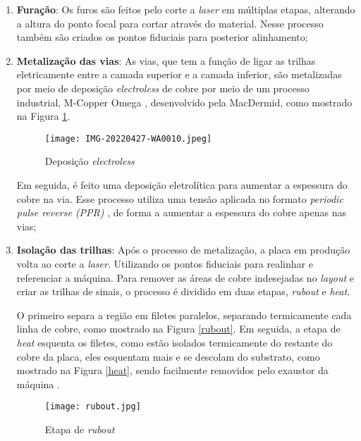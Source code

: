 \begin{enumerate}
    \item \textbf{Furação}: Os furos são feitos pelo corte a \textit{laser} em múltiplas etapas, alterando a altura do ponto focal para cortar através do material. Nesse processo também são criados os pontos fiduciais para posterior alinhamento;
    
    \item \textbf{Metalização das vias}: As vias, que tem a função de ligar as trilhas eletricamente entre a camada superior e a camada inferior, são metalizadas por meio de deposição \textit{electroless} de cobre por meio de um processo industrial, M-Copper Omega \cite{macdermid}, desenvolvido pela MacDermid, como mostrado na Figura \ref{electroless}.
    
        \begin{figure}[htbp]
            \centering
            \caption{Deposição \textit{electroless}}
            \texttt{[image: IMG-20220427-WA0010.jpeg]}
            
            \centering
            \label{electroless}
        \end{figure}
    Em seguida, é feito uma deposição eletrolítica para aumentar a espessura do cobre na via. Esse processo utiliza uma tensão aplicada no formato \textit{periodic pulse reverse (PPR)} \cite{Zhu_2014}, de forma a aumentar a espessura do cobre apenas nas vias;
    
    \item \textbf{Isolação das trilhas}: Após o processo de metalização, a placa em produção volta ao corte a \textit{laser}. Utilizando os pontos fiduciais para realinhar e referenciar a máquina. Para remover as áreas de cobre indesejadas no \textit{layout} e criar as trilhas de sinais, o processo é dividido em duas etapas, \textit{rubout} e \textit{heat}.
    
    O primeiro separa a região em filetes paralelos, separando termicamente cada linha de cobre, como mostrado na Figura \ref{rubout}. Em seguida, a etapa de \textit{heat} esquenta os filetes, como estão isolados termicamente do restante do cobre da placa, eles esquentam mais e se descolam do substrato, como mostrado na Figura \ref{heat}, sendo facilmente removidos pelo exaustor da máquina \cite{KMETEC20098598}.
    
        \begin{figure}[htbp]
            \centering
            \caption{Etapa de \textit{rubout}}
            \texttt{[image: rubout.jpg]}
            

\end{figure}
\end{enumerate}
